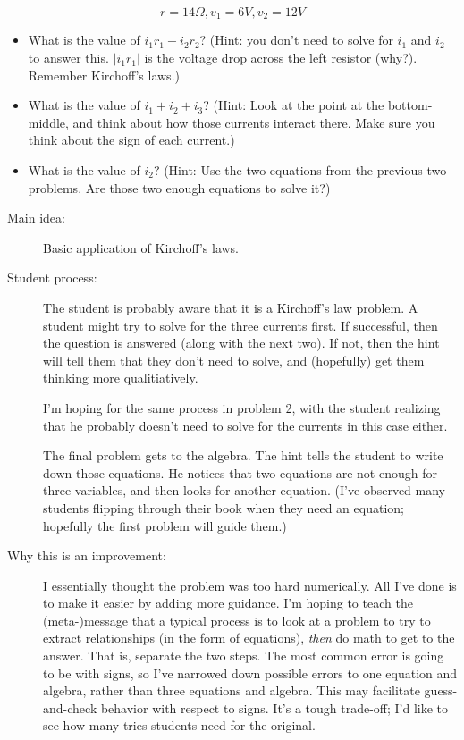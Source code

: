 \documentclass[12pt]{article}
\begin{document}
\[ r = 14 \Omega, v_1 = 6V, v_2 = 12V \]
\begin{itemize}
\item What is the value of $i_1 r_1 - i_2 r_2$?  (Hint: you don't need
to solve for $i_1$ and $i_2$ to answer this.  $|i_1 r_1|$ is the voltage
drop across the left resistor (why?).  Remember Kirchoff's laws.)

\item What is the value of $i_1 + i_2 + i_3$?  (Hint: Look at the point
at the bottom-middle, and think about how those currents interact
there.   Make sure you think about the sign of each current.)
\item What is the value of $i_2$?  (Hint: Use the two equations from the
previous two problems.  Are those two enough equations to solve it?)
\end{itemize}

\begin{description}
\item[Main idea:]
    Basic application of Kirchoff's laws.
\item[Student process:]
    The student is probably aware that it is a Kirchoff's law problem.
A student might try to solve for the three currents first.  If
successful, then the question is answered (along with the next two).  If
not, then the hint will tell them that they don't need to solve, and
(hopefully) get them thinking more qualitiatively.

    I'm hoping for the same process in problem 2, with the student
realizing that he probably doesn't need to solve for the currents in
this case either.

    The final problem gets to the algebra.  The hint tells the student
to write down those equations.  He notices that two equations are not
enough for three variables, and then looks for another equation.
(I've observed many students flipping through their book when they need
an equation; hopefully the first problem will guide them.)
\item[Why this is an improvement:]
    I essentially thought the problem was too hard numerically.  All
I've done is to make it easier by adding more guidance.  I'm hoping to
teach the (meta-)message that a typical process is to look at a problem
to try to extract relationships (in the form of equations),
\textit{then} do math to get to the answer.  That is, separate the two
steps.  The most common error is going to be with signs, so I've
narrowed down possible errors to one equation and algebra, rather than
three equations and algebra.  This may facilitate guess-and-check
behavior with respect to signs.  It's a tough trade-off; I'd like to see
how many tries students need for the original.
\end{description}
\end{document}
